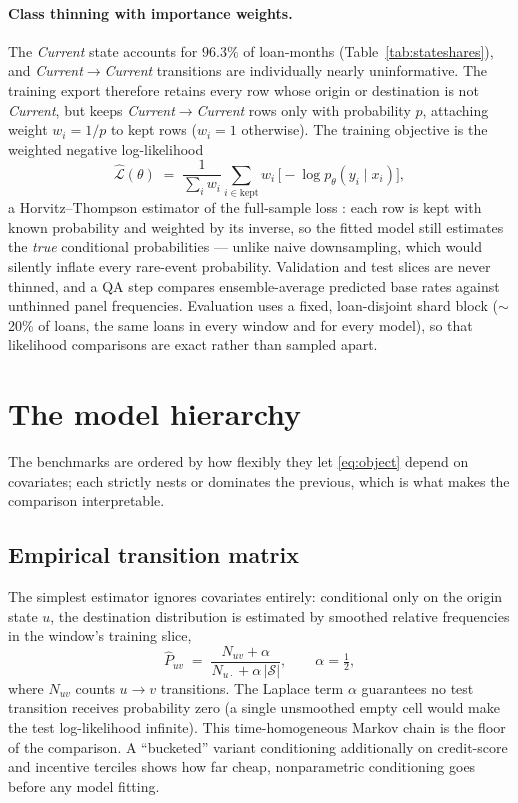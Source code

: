 \paragraph{Class thinning with importance weights.}
The \emph{Current} state accounts for $96.3\%$ of
loan-months (Table~\ref{tab:stateshares}), and
\emph{Current}$\to$\emph{Current} transitions are individually nearly
uninformative.  The training export therefore retains every row whose
origin or destination is not \emph{Current}, but keeps
\emph{Current}$\to$\emph{Current} rows only with probability $p$,
attaching weight $w_i = 1/p$ to kept rows ($w_i = 1$ otherwise).  The
training objective is the weighted negative log-likelihood
\begin{equation}
\label{eq:weightednll}
\widehat{\mathcal{L}}(\theta) \;=\;
\frac{1}{\sum_i w_i}\sum_{i \in \text{kept}} w_i\,
\bigl[-\log p_\theta\!\left(y_i \mid x_i\right)\bigr],
\end{equation}
a Horvitz--Thompson estimator of the full-sample loss
\citep{ht1952}: each row is kept with known probability and weighted
by its inverse, so the fitted model still estimates the \emph{true}
conditional probabilities --- unlike naive downsampling, which would
silently inflate every rare-event probability.  Validation and test
slices are never thinned, and a QA step compares ensemble-average
predicted base rates against unthinned panel frequencies.
Evaluation uses a fixed, loan-disjoint shard block ($\sim$20\% of
loans, the same loans in every window and for every model), so that
likelihood comparisons are exact rather than sampled apart.

\section{The model hierarchy}
\label{sec:meth-models}

The benchmarks are ordered by how flexibly they let
\eqref{eq:object} depend on covariates; each strictly nests or
dominates the previous, which is what makes the comparison
interpretable.

\subsection{Empirical transition matrix}
\label{subsec:meth-empirical}

The simplest estimator ignores covariates entirely: conditional only
on the origin state $u$, the destination distribution is estimated by
smoothed relative frequencies in the window's training slice,
\begin{equation}
\label{eq:empirical}
\widehat{P}_{uv} \;=\; \frac{N_{uv} + \alpha}{N_{u\cdot} +
\alpha\,|\mathcal{S}|}, \qquad \alpha = \tfrac12,
\end{equation}
where $N_{uv}$ counts $u\to v$ transitions.  The Laplace term
$\alpha$ guarantees no test transition receives probability zero (a
single unsmoothed empty cell would make the test log-likelihood
infinite).  This time-homogeneous Markov chain is the floor of the
comparison.  A ``bucketed'' variant conditioning additionally on
credit-score and incentive terciles shows how far cheap,
nonparametric conditioning goes before any model fitting.

